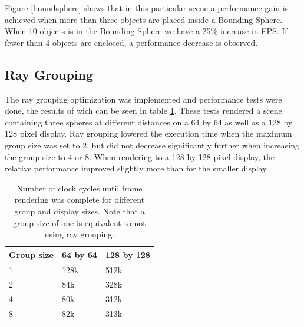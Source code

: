 			Figure \ref{boundsphere} shows that in this particular scene a
			performance gain is achieved when more than three objects are
			placed inside a Bounding Sphere.  When 10 objects is in the
			Bounding Sphere we have a 25\% increase in FPS.  If fewer than 4
			objects are enclosed, a performance decrease is observed. 
		
		\subsection{Ray Grouping}
			
			The ray grouping optimization was implemented and performance tests
			were done, the results of wich can be seen in table
			\ref{grouptable}. These tests rendered a scene containing three
			spheres at different distances on a 64 by 64 as well as a 128 by 128
			pixel display. Ray grouping lowered the execution time when the
			maximum group size was set to 2, but did not decrease significantly
			further when increasing the group size to 4 or 8. When rendering to
			a 128 by 128 pixel display, the relative performance improved
			slightly more than for the smaller display.

			\begin{table}[T]
			\centering
			\begin{tabular}{lll}
				\hline
				Group size & 64 by 64 & 128 by 128 \\
				\hline
				1          & 128k     &  512k      \\
				2          & 84k      &  328k      \\
				4          & 80k      &  312k      \\
				8          & 82k      &  313k      \\
				\hline
			\end{tabular}
			\caption{Number of clock cycles until frame rendering was complete
				for different group and display sizes. Note that a group size 
				of one is equivalent to not using ray grouping.}
			\label{grouptable}
			\end{table}
